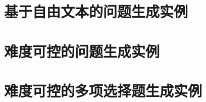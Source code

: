 \cleardoublepage
{

    \appendixsecmajornumbering
    
    \section{基于自由文本的问题生成实例}

    
    \section{难度可控的问题生成实例}

    \section{难度可控的多项选择题生成实例}
}